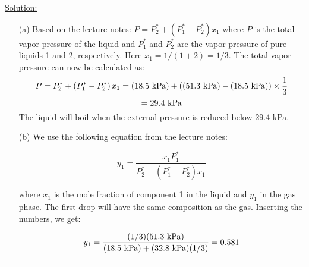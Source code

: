 \noindent
\underline{Solution:}

\begin{itemize}

\item[(a)] Based on the lecture notes: $P = P_2^* + \left(P_1^* - P_2^*\right)x_1$ where $P$ is the total vapor pressure of the liquid and $P_1^*$ and $P_2^*$ are the vapor pressure of pure liquids 1 and 2, respectively. Here $x_1 = 1 / (1 + 2) = 1/3$. The total vapor pressure can now be calculated as:
$$P = P_2^* + \left(P_1^* - P_2^*\right)x_1 = \left(18.5\textnormal{ kPa}\right) + \left((51.3\textnormal{ kPa}) - (18.5\textnormal{ kPa})\right)\times\frac{1}{3}$$
$$ = 29.4\textnormal{ kPa}$$
The liquid will boil when the external pressure is reduced below 29.4 kPa.

\item[(b)] We use the following equation from the lecture notes:

$$y_1 = \frac{x_1P_1^*}{P_2^* + \left(P_1^* - P_2^*\right)x_1}$$

where $x_1$ is the mole fraction of component 1 in the liquid and $y_1$ in the gas phase. The first drop will have the same composition as the gas. Inserting the numbers, we get:

$$y_1 = \frac{(1/3)(51.3\textnormal{ kPa})}{(18.5\textnormal{ kPa})+(32.8\textnormal{ kPa})(1/3)} = 0.581$$
\end{itemize}

\hrule\vspace{0.5cm}
